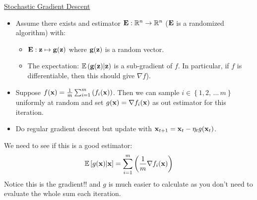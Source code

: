 \documentclass[11pt]{article}
\begin{document}
\begin{mdframed}[backgroundcolor=blue!05,topline=false,bottomline=false,leftline=false,rightline=false] 
	\underline{\sc Stochastic Gradient Descent}
	\begin{itemize}
		\item Assume there exists and estimator ${\bf E} : \mathbb{R}^{n} \rightarrow \mathbb{R}^{n}$ (${\bf E}$ is a randomized algorithm) with:
		\begin{itemize}
		  \item ${\bf E} : {\bf z} \mapsto {\bf g}({\bf z})$ where ${\bf g}({\bf z})$ is a random vector.
		  \item The expectation: $\mathbb{E} \left( {\bf g}({\bf z}) \middle| {\bf z} \right)$ is a sub-gradient of $f$.  In particular, if $f$ is differentiable, then this should give $\nabla f$).
		\end{itemize}
		\item Suppose $f({\bf x}) = \frac{1}{m} \sum_{i = 1}^{m} \left( f_{i} ({\bf x}) \right)$.  Then we can sample $i \in \left\lbrace 1, 2, \,...\, m \right\rbrace$ uniformly at random and set $g({\bf x}) = \nabla f_{i} ({\bf x})$ as out estimator for this iteration.
		\item Do regular gradient descent but update with ${\bf x}_{t + 1} = {\bf x}_{t} - \eta_{t} g({\bf x}_{t})$.
	\end{itemize}
\end{mdframed}
We need to see if this is a good estimator:
\[ \mathbb{E} \left[ g({\bf x}) | {\bf x} \right] = \sum_{i = 1}^{m} \left( \frac{1}{m} \nabla f_{i} ({\bf x}) \right) \]
Notice this is the gradient!! and $g$ is much easier to calculate as you don't need to evaluate the whole sum each iteration.
\end{document}
